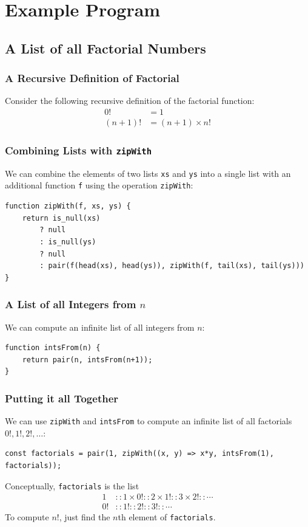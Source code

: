\documentclass[12pt]{beamer}
\begin{document}
\section{Example Program}


\subsection{A List of all Factorial Numbers}

\begin{frame}
\frametitle{A Recursive Definition of Factorial}
Consider the following recursive definition of the factorial function:
\begin{align*}
0! &= 1 \\
(n+1)! &= (n+1)\times n!
\end{align*}
\end{frame}

\begin{frame}[fragile]
\frametitle{Combining Lists with \texttt{zipWith}}
We can combine the elements of two lists \texttt{xs} and \texttt{ys} into a single list with an additional function \texttt{f} using the operation \texttt{zipWith}:
\begin{lstlisting}
function zipWith(f, xs, ys) {
	return is_null(xs)
		? null
		: is_null(ys)
		? null
		: pair(f(head(xs), head(ys)), zipWith(f, tail(xs), tail(ys)))
}
\end{lstlisting}
\end{frame}

\begin{frame}[fragile]
\frametitle{A List of all Integers from $n$}
We can compute an infinite list of all integers from $n$:
\begin{lstlisting}
function intsFrom(n) {
	return pair(n, intsFrom(n+1));
}
\end{lstlisting}
\end{frame}

\begin{frame}[fragile]
\frametitle{Putting it all Together}
We can use \texttt{zipWith} and \texttt{intsFrom} to compute an infinite list of all factorials $0!, 1!, 2!,\ldots$:
\begin{lstlisting}
const factorials = pair(1, zipWith((x, y) => x*y, intsFrom(1), factorials));
\end{lstlisting}\pause
Conceptually, \texttt{factorials} is the list
\begin{align*}
1 &:: 1 \times 0! :: 2 \times 1! :: 3 \times 2! :: \cdots \\
0! &:: 1! :: 2! :: 3! :: \cdots
\end{align*}
To compute $n!$, just find the $n$th element of \texttt{factorials}.
\end{frame}
\end{document}
